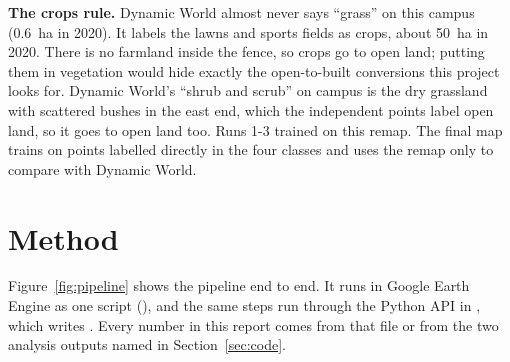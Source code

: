 \documentclass[11pt,a4paper]{article}
\begin{document}
\textbf{The crops rule.} Dynamic World almost never says ``grass'' on this campus (0.6~ha in 2020). It labels the lawns and sports fields as crops, about 50~ha in 2020. There is no farmland inside the fence, so crops go to open land; putting them in vegetation would hide exactly the open-to-built conversions this project looks for. Dynamic World's ``shrub and scrub'' on campus is the dry grassland with scattered bushes in the east end, which the independent points label open land, so it goes to open land too. Runs 1-3 trained on this remap. The final map trains on points labelled directly in the four classes and uses the remap only to compare with Dynamic World.

\section{Method}
\label{sec:method}

Figure~\ref{fig:pipeline} shows the pipeline end to end. It runs in Google Earth Engine as one script (), and the same steps run through the Python API in , which writes . Every number in this report comes from that file or from the two analysis outputs named in Section~\ref{sec:code}.
\end{document}
